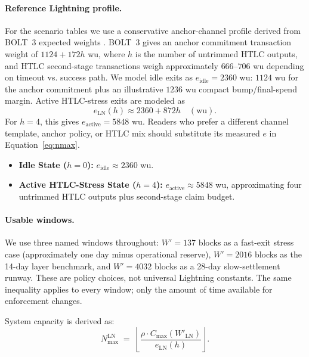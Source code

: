 \documentclass{article}
\theoremstyle{definition}
\begin{document}
\paragraph{Reference Lightning profile.}
For the scenario tables we use a conservative anchor-channel profile derived from BOLT~3 expected weights \cite{bolt3}. BOLT~3 gives an anchor commitment transaction weight of $1124 + 172h$ wu, where $h$ is the number of untrimmed HTLC outputs, and HTLC second-stage transactions weigh approximately $666$--$706$ wu depending on timeout vs. success path. We model idle exits as $e_{\mathrm{idle}}=2360$ wu: $1124$ wu for the anchor commitment plus an illustrative $1236$ wu compact bump/final-spend margin. Active HTLC-stress exits are modeled as
\small
\begin{equation*}
e_{\mathrm{LN}}(h) \approx 2360 + 872h \quad (\mathrm{wu}).
\end{equation*}
\normalsize
For $h=4$, this gives $e_{\mathrm{active}}=5848$ wu. Readers who prefer a different channel template, anchor policy, or HTLC mix should substitute its measured $e$ in Equation~\eqref{eq:nmax}.

\begin{itemize}
    \item \textbf{Idle State ($h=0$):} $e_{\mathrm{idle}} \approx 2360$ wu.
    \item \textbf{Active HTLC-Stress State ($h=4$):} $e_{\mathrm{active}} \approx 5848$ wu, approximating four untrimmed HTLC outputs plus second-stage claim budget.
\end{itemize}

\paragraph{Usable windows.}
We use three named windows throughout: $W'=137$ blocks as a fast-exit stress case (approximately one day minus operational reserve), $W'=2016$ blocks as the 14-day layer benchmark, and $W'=4032$ blocks as a 28-day slow-settlement runway. These are policy choices, not universal Lightning constants. The same inequality applies to every window; only the amount of time available for enforcement changes.

System capacity is derived as:
\small
\begin{equation}
N_{\max}^{\mathrm{LN}} \;=\; \left\lfloor \frac{\rho \cdot C_{\max}(W'_{\mathrm{LN}})}{e_{\mathrm{LN}}(h)}\right\rfloor.\label{eq:nmax}
\end{equation}
\normalsize
\end{document}
